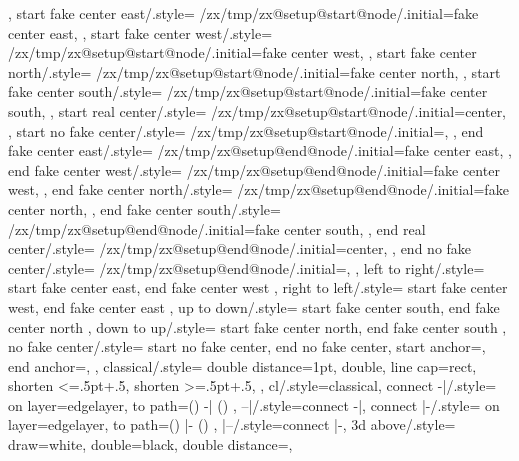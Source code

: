 {{{{        %
      }%
    },
    start fake center east/.style={%
      /zx/tmp/zx@setup@start@node/.initial=fake center east,
    },
    start fake center west/.style={%
      /zx/tmp/zx@setup@start@node/.initial=fake center west,
    },
    start fake center north/.style={%
      /zx/tmp/zx@setup@start@node/.initial=fake center north,
    },
    start fake center south/.style={%
      /zx/tmp/zx@setup@start@node/.initial=fake center south,
    },
    start real center/.style={
      /zx/tmp/zx@setup@start@node/.initial=center,
    },
    start no fake center/.style={
      /zx/tmp/zx@setup@start@node/.initial=,
    },
    end fake center east/.style={%
      /zx/tmp/zx@setup@end@node/.initial=fake center east,
    },
    end fake center west/.style={%
      /zx/tmp/zx@setup@end@node/.initial=fake center west,
    },
    end fake center north/.style={%
      /zx/tmp/zx@setup@end@node/.initial=fake center north,
    },
    end fake center south/.style={%
      /zx/tmp/zx@setup@end@node/.initial=fake center south,
    },
    end real center/.style={
      /zx/tmp/zx@setup@end@node/.initial=center,
    },
    end no fake center/.style={
      /zx/tmp/zx@setup@end@node/.initial=,
    },
    left to right/.style={
      start fake center east,
      end fake center west
    },
    right to left/.style={
      start fake center west,
      end fake center east
    },
    up to down/.style={
      start fake center south,
      end fake center north
    },
    down to up/.style={
      start fake center north,
      end fake center south
    },
    no fake center/.style={
      start no fake center,
      end no fake center,
      start anchor=,
      end anchor=,
    },
    classical/.style={
      double distance=1pt,
      double,
      line cap=rect,
      shorten <=.5pt+.5\pgflinewidth,
      shorten >=.5pt+.5\pgflinewidth,
    },
    cl/.style={classical},
    connect -|/.style={
      on layer={edgelayer},
      to path={(\tikztostart) -| (\tikztotarget) \tikztonodes}
    },
    --|/.style={connect -|},
    connect |-/.style={
      on layer={edgelayer},
      to path={(\tikztostart) |- (\tikztotarget) \tikztonodes}
    },
    |--/.style={connect |-},
    3d above/.style={
      draw=white,
      double=black,
      double distance=\pgflinewidth,
}}}
